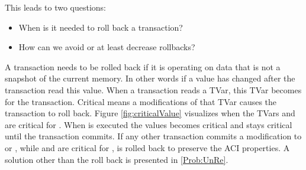 This leads to two questions:
\begin{itemize}
 \item When is it needed to roll back a transaction?
 \item How can we avoid or at least decrease rollbacks?
\end{itemize}
A transaction needs to be rolled back if it is operating on data that is not a snapshot of the current memory. In other words 
if a value has changed after the transaction read this value. When a transaction reads a TVar, this TVar becomes 
 for the transaction. Critical means a modifications of that TVar causes the transaction to roll back.
Figure \ref{fig:criticalValue} visualizes when the TVars  and  are critical for .
When  is executed the values becomes critical and stays critical until the transaction commits.
If any other transaction commits a modification to  or , while  and  are
critical for ,  is rolled back to preserve the ACI properties. A solution other
than the roll back is presented in \ref{Prob:UnRe}. 

